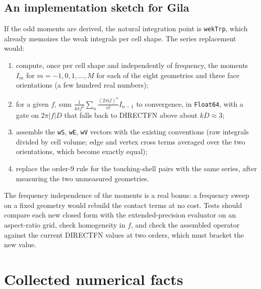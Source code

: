 \documentclass[11pt]{article}
\theoremstyle{remark}
\newcommand{\ii}{\mathrm{i}}
\newcommand{\code}[1]{\texttt{#1}}
\begin{document}
\subsection{An implementation sketch for Gila}

If the odd moments are derived, the natural integration point is \code{wekTrp},
which already memoizes the weak integrals per cell shape. The series replacement
would:
\begin{enumerate}[nosep]
\item compute, once per cell shape and independently of frequency, the moments
$I_m$ for $m = -1, 0, 1, \ldots, M$ for each of the eight geometries and three face
orientations (a few hundred real numbers);
\item for a given $f$, sum $\frac{1}{4\pi f^2}\sum_n \frac{(2\pi\ii f)^n}{n!} I_{n-1}$
to convergence, in \code{Float64}, with a gate on $2\pi|f|D$ that falls back to
DIRECTFN above about $kD\approx 3$;
\item assemble the \code{wS}, \code{wE}, \code{wV} vectors with the existing
conventions (raw integrals divided by cell volume; edge and vertex cross terms
averaged over the two orientations, which become exactly equal);
\item replace the order-9 rule for the touching-shell pairs with the same series, after measuring the two unmeasured geometries.
\end{enumerate}
The frequency independence of the moments is a real bonus: a frequency sweep on a
fixed geometry would rebuild the contact terms at no cost. Tests should compare each
new closed form with the extended-precision evaluator on an aspect-ratio grid,
check homogeneity in $f$, and check the assembled operator against the current
DIRECTFN values at two orders, which must bracket the new value.

\section{Collected numerical facts}
\label{sec:facts}
\end{document}

